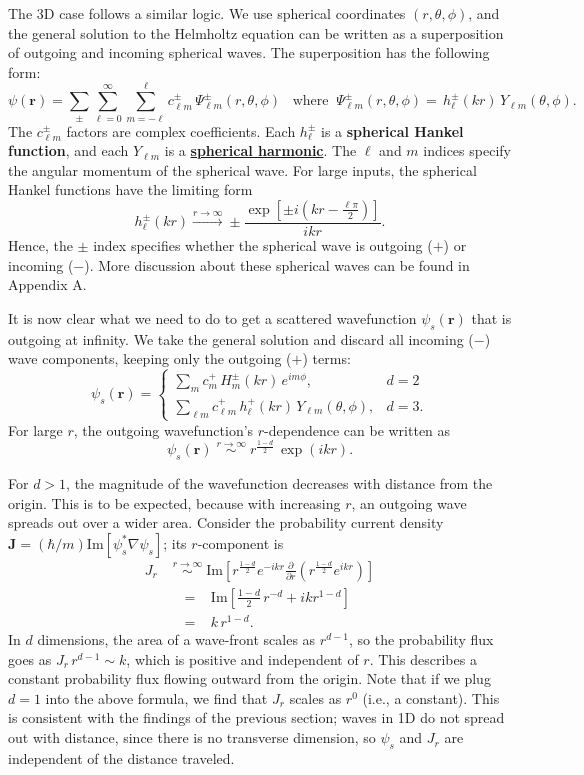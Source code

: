 \documentclass[pra,12pt]{revtex4}
\begin{document}
The 3D case follows a similar logic.  We use spherical coordinates
$(r,\theta,\phi)$, and the general solution to the Helmholtz equation
can be written as a superposition of outgoing and incoming spherical
waves.  The superposition has the following form:
$$\psi(\mathbf{r})=\sum_{\pm}\sum_{\ell=0}^\infty\sum_{m=-\ell}^\ell c_{\ell m}^\pm \,\Psi_{\ell m}^\pm(r,\theta,\phi)\;\;\;\mathrm{where}\;\;\Psi_{\ell m}^\pm(r,\theta,\phi) = \,h_\ell^\pm(kr)\,Y_{\ell m}(\theta,\phi).$$
The $c_{\ell m}^\pm$ factors are complex coefficients.  Each
$h_\ell^\pm$ is a \textbf{spherical Hankel function}, and each
$Y_{\ell m}$ is a
\href{https://en.wikipedia.org/wiki/Spherical_harmonics}{\textbf{spherical
    harmonic}}.  The $\ell$ and $m$ indices specify the angular
momentum of the spherical wave.  For large inputs, the spherical
Hankel functions have the limiting form
$$h_\ell^\pm(kr) \overset{r\rightarrow\infty}{\longrightarrow} \pm \frac{\exp\!\left[\pm i\!\left(kr-\frac{\ell\pi}{2}\right)\right]}{ikr}.$$
Hence, the $\pm$ index specifies whether the spherical wave is
outgoing ($+$) or incoming ($-$).  More discussion about these
spherical waves can be found in Appendix A.

It is now clear what we need to do to get a scattered wavefunction
$\psi_s(\mathbf{r})$ that is outgoing at infinity.  We take the
general solution and discard all incoming ($-$) wave components,
keeping only the outgoing ($+$) terms:
$$\psi_s(\mathbf{r}) = \begin{cases} \displaystyle\sum_{m} c_m^+\,H_m^\pm(kr)\,e^{im\phi}, &d=2\\ \displaystyle\sum_{\ell m} c_{\ell m}^+\,h_\ell^+(kr)\,Y_{\ell m}(\theta,\phi),&d=3.\end{cases}$$
For large $r$, the outgoing wavefunction's $r$-dependence can be
written as
$$\psi_s(\mathbf{r}) \; \overset{r\rightarrow\infty}{\sim} \; r^{\frac{1-d}{2}} \,\exp\left(ikr\right).$$

For $d > 1$, the magnitude of the wavefunction decreases with distance
from the origin.  This is to be expected, because with increasing $r$,
an outgoing wave spreads out over a wider area.  Consider the
probability current density $\mathbf{J} = (\hbar/m)
\mathrm{Im}\left[\psi_s^*\nabla\psi_s\right]$; its $r$-component is
$$\begin{aligned}J_r \; &\overset{r\rightarrow\infty}{\sim} \; \mathrm{Im}\left[r^{\frac{1-d}{2}} e^{-ikr} \frac{\partial}{\partial r}\left(r^{\frac{1-d}{2}} e^{ikr}\right)\right] \\ &\;\;=\;\;\;\mathrm{Im}\left[\frac{1-d}{2}\, r^{-d} + ik r^{1-d}\right]\\ &\;\;=\;\;\; k \,r^{1-d}.\end{aligned}$$
In $d$ dimensions, the area of a wave-front scales as $r^{d-1}$, so
the probability flux goes as $J_r \,r^{d-1} \sim k$, which is
positive and independent of $r$.  This describes a constant
probability flux flowing outward from the origin.  Note that if we
plug $d=1$ into the above formula, we find that $J_r$ scales as $r^0$
(i.e., a constant).  This is consistent with the findings of the
previous section; waves in 1D do not spread out with distance, since
there is no transverse dimension, so $\psi_s$ and $J_r$ are
independent of the distance traveled.
\end{document}
